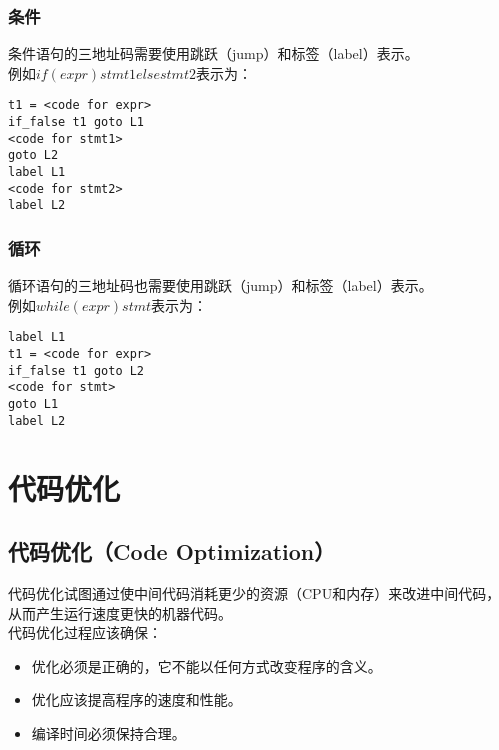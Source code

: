 \subsubsection{条件}

条件语句的三地址码需要使用跳跃（jump）和标签（label）表示。\\

例如$ if(expr) stmt1 else stmt2 $表示为：

\vspace{-0.5cm}

\begin{lstlisting}
t1 = <code for expr>
if_false t1 goto L1
<code for stmt1>
goto L2
label L1
<code for stmt2>
label L2
\end{lstlisting}

\vspace{0.5cm}

\subsubsection{循环}

循环语句的三地址码也需要使用跳跃（jump）和标签（label）表示。\\

例如$ while(expr) stmt $表示为：

\vspace{-0.5cm}

\begin{lstlisting}
label L1
t1 = <code for expr>
if_false t1 goto L2
<code for stmt>
goto L1
label L2
\end{lstlisting}

\newpage

\section{代码优化}

\subsection{代码优化（Code Optimization）}

代码优化试图通过使中间代码消耗更少的资源（CPU和内存）来改进中间代码，从而产生运行速度更快的机器代码。\\

代码优化过程应该确保：

\begin{itemize}
    \item 优化必须是正确的，它不能以任何方式改变程序的含义。
    \item 优化应该提高程序的速度和性能。
    \item 编译时间必须保持合理。
\end{itemize}


